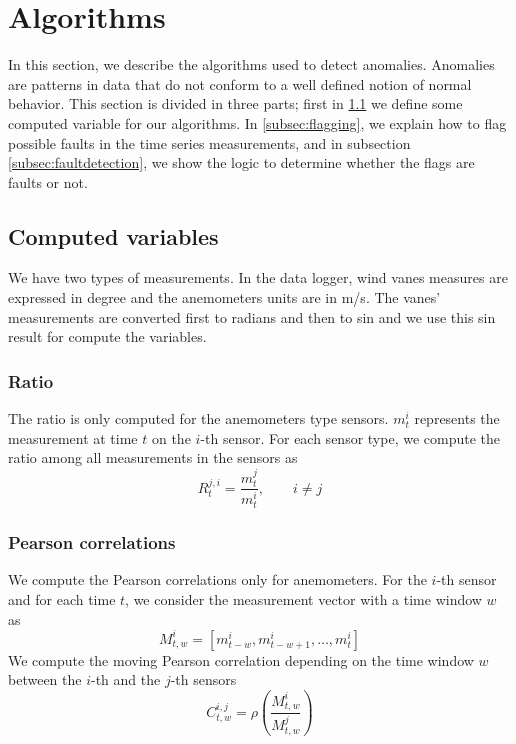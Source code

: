 \documentclass[journal]{IEEEtran}
\begin{document}

\section{Algorithms}\label{sec:algorithms}
In this section, we describe the algorithms used to detect anomalies. Anomalies are patterns in data that do not conform to a well defined notion of normal behavior. This section is divided in three parts; first in \ref{subsec:computedvariables} we define some computed variable for our algorithms. In \ref{subsec:flagging}, we explain how to flag possible faults in the time series measurements, and in subsection \ref{subsec:faultdetection}, we show the logic to determine whether the flags are faults or not.  
\subsection{Computed variables}\label{subsec:computedvariables}
We have two types of measurements. In the data logger, wind vanes measures are expressed in degree and the anemometers units are in m/s. The  vanes' measurements are converted first to radians and then to sin and we use this sin result for compute the variables.
\subsubsection{Ratio}
The ratio is only computed for the anemometers type sensors. $m_t^{i}$ represents the measurement at time $t$ on the $i$-th sensor.
For each sensor type, we compute the ratio among all measurements in the sensors as
\begin{equation}
R_{t}^{j,i} = \frac{m_{t}^{j}}{m_{t}^{i}},\qquad i \neq j 
\end{equation} 

\subsubsection{Pearson correlations}
We compute the Pearson correlations only for anemometers. For the $i$-th sensor and for each time $t$, we consider the measurement vector with a time window $w$ as 
\begin{equation}
M^i_{t,w} = [m_{t-w}^i,m_{t-w+1}^i,\ldots,m_t^i]
\end{equation}
We compute the moving Pearson correlation depending on the time window $w$ between the $i$-th and the $j$-th sensors
\begin{equation}
C^{i,j}_{t,w}= \rho\left( \frac{M^i_{t,w}}{M^j_{t,w}}\right)
\end{equation}
\end{document}

